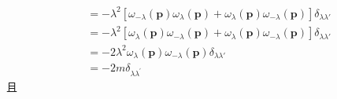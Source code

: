 \begin{equation}
\begin{aligned}
\\
&=-\lambda ^2\left[ \omega _{-\lambda}\left( \mathbf{p} \right) \omega _{\lambda}\left( \mathbf{p} \right) +\omega _{\lambda}\left( \mathbf{p} \right) \omega _{-\lambda}\left( \mathbf{p} \right) \right] \delta _{\lambda \lambda \prime}
\\
&=-\lambda ^2\left[ \omega _{\lambda}\left( \mathbf{p} \right) \omega _{-\lambda}\left( \mathbf{p} \right) +\omega _{\lambda}\left( \mathbf{p} \right) \omega _{-\lambda}\left( \mathbf{p} \right) \right] \delta _{\lambda \lambda \prime}
\\
&=-2\lambda ^2\omega _{\lambda}\left( \mathbf{p} \right) \omega _{-\lambda}\left( \mathbf{p} \right) \delta _{\lambda \lambda \prime}
\\
&=-2m\delta _{\lambda \lambda ^{\prime}}
    \end{aligned}
\end{equation}
且
